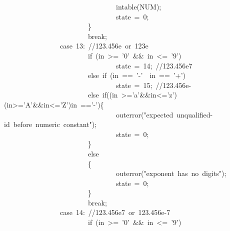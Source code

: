 \documentclass{article}
\begin{document}
\begin{mdpre}
~~~~~~~~~~~~~~~~~~~~~~~~~~~~~~~~intable({NUM});\\
~~~~~~~~~~~~~~~~~~~~~~~~~~~~~~~~state~=~{0};\\
~~~~~~~~~~~~~~~~~~~~~~~~\}\\
~~~~~~~~~~~~~~~~~~~~~~~~{break};\\
~~~~~~~~~~~~~~~~{case}~{13}:~{//123.456e~or~123e}\\
~~~~~~~~~~~~~~~~~~~~~~~~{if}~(in~\textgreater{}=~{'0'}~\&\&~in~\textless{}=~{'9'})\\
~~~~~~~~~~~~~~~~~~~~~~~~~~~~~~~~state~=~{14};~{//123.456e7}\\
~~~~~~~~~~~~~~~~~~~~~~~~{else}~{if}~(in~==~{'-'}~\textbar{}\textbar{}~in~==~{'+'})\\
~~~~~~~~~~~~~~~~~~~~~~~~~~~~~~~~state~=~{15};~{//123.456e-}\\
~~~~~~~~~~~~~~~~~~~~~~~~{else}~{if}((in~\textgreater{}={'a'}\&\&in\textless{}={'z'})\textbar{}\textbar{}(in\textgreater{}={'A'}\&\&in\textless{}={'Z'})\textbar{}\textbar{}in~=={'-'})\{\\
~~~~~~~~~~~~~~~~~~~~~~~~~~~~~~~~outerror({"}{expected~unqualified-id~before~numeric~constant}{"});\\
~~~~~~~~~~~~~~~~~~~~~~~~~~~~~~~~state~=~{0};\\
~~~~~~~~~~~~~~~~~~~~~~~~\}\\
~~~~~~~~~~~~~~~~~~~~~~~~{else}\\
~~~~~~~~~~~~~~~~~~~~~~~~\{\\
~~~~~~~~~~~~~~~~~~~~~~~~~~~~~~~~outerror({"}{exponent~has~no~digits}{"});\\
~~~~~~~~~~~~~~~~~~~~~~~~~~~~~~~~state~=~{0};\\
~~~~~~~~~~~~~~~~~~~~~~~~\}\\
~~~~~~~~~~~~~~~~~~~~~~~~{break};\\
~~~~~~~~~~~~~~~~{case}~{14}:~{//123.456e7~or~123.456e-7}\\
~~~~~~~~~~~~~~~~~~~~~~~~{if}~(in~\textgreater{}=~{'0'}~\&\&~in~\textless{}=~{'9'})\\

\end{mdpre}
\end{document}
